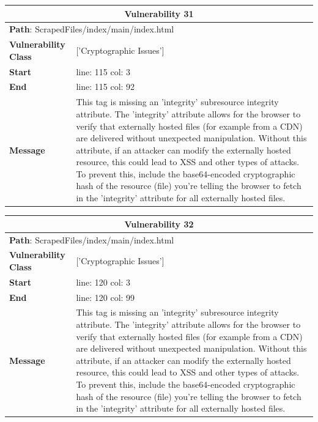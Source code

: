 \documentclass[12pt]{article}
\begin{document}
\vspace{0.7cm}
\FloatBarrier
\begin{table}[!h]
\centering
\renewcommand{\arraystretch}{1.3}
\begin{tabular}{|l|p{10cm}|}
\hline
\multicolumn{2}{|c|}{\textbf{Vulnerability 31}} \\
\hline
\multicolumn{2}{|l|}{\textbf{Path}: ScrapedFiles/index/main/index.html} \\
\hline
\textbf{Vulnerability Class} & ['Cryptographic Issues'] \\
\hline
\textbf{Start} & line: 115 \quad col: 3 \\
\hline
\textbf{End} & line: 115 \quad col: 92 \\
\hline
\textbf{Message} & This tag is missing an 'integrity' subresource integrity attribute. The 'integrity' attribute allows for the browser to verify that externally hosted files (for example from a CDN) are delivered without unexpected manipulation. Without this attribute, if an attacker can modify the externally hosted resource, this could lead to XSS and other types of attacks. To prevent this, include the base64-encoded cryptographic hash of the resource (file) you're telling the browser to fetch in the 'integrity' attribute for all externally hosted files. \\
\hline
\end{tabular}
\end{table}
\vspace{0.7cm}
\FloatBarrier
\begin{table}[!h]
\centering
\renewcommand{\arraystretch}{1.3}
\begin{tabular}{|l|p{10cm}|}
\hline
\multicolumn{2}{|c|}{\textbf{Vulnerability 32}} \\
\hline
\multicolumn{2}{|l|}{\textbf{Path}: ScrapedFiles/index/main/index.html} \\
\hline
\textbf{Vulnerability Class} & ['Cryptographic Issues'] \\
\hline
\textbf{Start} & line: 120 \quad col: 3 \\
\hline
\textbf{End} & line: 120 \quad col: 99 \\
\hline
\textbf{Message} & This tag is missing an 'integrity' subresource integrity attribute. The 'integrity' attribute allows for the browser to verify that externally hosted files (for example from a CDN) are delivered without unexpected manipulation. Without this attribute, if an attacker can modify the externally hosted resource, this could lead to XSS and other types of attacks. To prevent this, include the base64-encoded cryptographic hash of the resource (file) you're telling the browser to fetch in the 'integrity' attribute for all externally hosted files. \\
\hline
\end{tabular}
\end{table}
\end{document}
